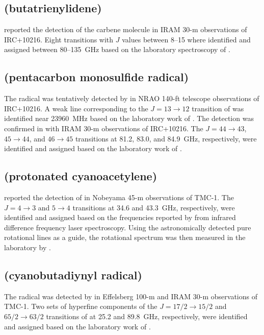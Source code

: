 \documentclass[twocolumn]{aastex631}
\begin{document}
	\subsection{ (butatrienylidene)}
	\label{H2C4}
	
	\citet{Cernicharo:1991ck} reported the detection of the  carbene molecule in IRAM 30-m observations of IRC+10216.  Eight transitions with $J$ values between 8--15 where identified and assigned between 80--135~GHz based on the laboratory spectroscopy of \citet{Killian:1990di}.
	
	\subsection{ (pentacarbon monosulfide radical)}
	\label{C5S}
	
	The  radical was tentatively detected by \citet{Bell:1993ir} in NRAO 140-ft telescope observations of IRC+10216.  A weak line corresponding to the $J = 13\rightarrow12$ transition of  was identified near 23960~MHz based on the laboratory work of \citet{Kasai:1993ds}.  The detection was confirmed in \citet{Agundez:2014gm} with IRAM 30-m observations of IRC+10216.  The $J = 44\rightarrow43$, $45\rightarrow44$, and $46\rightarrow45$ transitions at 81.2, 83.0, and 84.9~GHz, respectively, were identified and assigned based on the laboratory work of \citet{Gordon:2001pd}.
	
	\subsection{ (protonated cyanoacetylene)}
	\label{HC3NH+}
	
	\citet{Kawaguchi:1994ez} reported the detection of  in Nobeyama 45-m observations of TMC-1.  The $J = 4\rightarrow3$ and $5\rightarrow4$ transitions at 34.6 and 43.3~GHz, respectively, were identified and assigned based on the frequencies reported by \citet{Lee:1987dk} from infrared difference frequency laser spectroscopy.  Using the astronomically detected pure rotational lines as a guide, the rotational spectrum was then measured in the laboratory by \citet{Gottlieb:2000nc}.
	
	\subsection{ (cyanobutadiynyl radical)}
	\label{C5N}
	
	The  radical was detected by \citet{Guelin:1998kf} in Effelsberg 100-m and IRAM 30-m observations of TMC-1.  Two sets of hyperfine components of the $J = 17/2\rightarrow15/2$ and $65/2\rightarrow63/2$ transitions of  at 25.2 and 89.8~GHz, respectively, were identified and assigned based on the laboratory work of \citet{Kasai:1997gx}.
	
\end{document}
